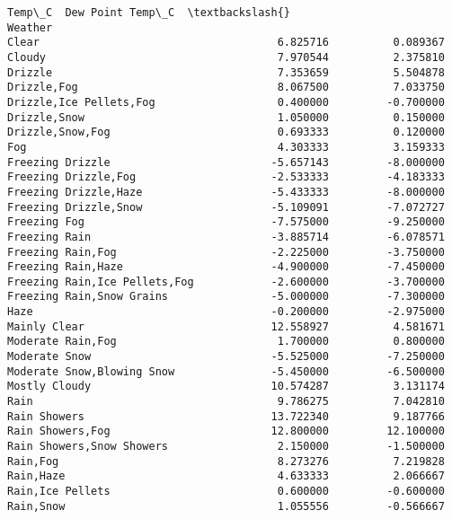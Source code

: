 \documentclass[11pt]{article}
\makeatletter
\newcommand{\boxspacing}{\kern\kvtcb@left@rule\kern\kvtcb@boxsep}
\newcommand{\prompt}[4]{
        {\ttfamily\llap{{\color{#2}[#3]:\hspace{3pt}#4}}\vspace{-\baselineskip}}
    }
\makeatother
\begin{document}
            \begin{tcolorbox}[breakable, size=fbox, boxrule=.5pt, pad at break*=1mm, opacityfill=0]
\prompt{Out}{outcolor}{59}{\boxspacing}
\begin{Verbatim}[commandchars=\\\{\}]
                                            Temp\_C  Dew Point Temp\_C  \textbackslash{}
Weather
Clear                                     6.825716          0.089367
Cloudy                                    7.970544          2.375810
Drizzle                                   7.353659          5.504878
Drizzle,Fog                               8.067500          7.033750
Drizzle,Ice Pellets,Fog                   0.400000         -0.700000
Drizzle,Snow                              1.050000          0.150000
Drizzle,Snow,Fog                          0.693333          0.120000
Fog                                       4.303333          3.159333
Freezing Drizzle                         -5.657143         -8.000000
Freezing Drizzle,Fog                     -2.533333         -4.183333
Freezing Drizzle,Haze                    -5.433333         -8.000000
Freezing Drizzle,Snow                    -5.109091         -7.072727
Freezing Fog                             -7.575000         -9.250000
Freezing Rain                            -3.885714         -6.078571
Freezing Rain,Fog                        -2.225000         -3.750000
Freezing Rain,Haze                       -4.900000         -7.450000
Freezing Rain,Ice Pellets,Fog            -2.600000         -3.700000
Freezing Rain,Snow Grains                -5.000000         -7.300000
Haze                                     -0.200000         -2.975000
Mainly Clear                             12.558927          4.581671
Moderate Rain,Fog                         1.700000          0.800000
Moderate Snow                            -5.525000         -7.250000
Moderate Snow,Blowing Snow               -5.450000         -6.500000
Mostly Cloudy                            10.574287          3.131174
Rain                                      9.786275          7.042810
Rain Showers                             13.722340          9.187766
Rain Showers,Fog                         12.800000         12.100000
Rain Showers,Snow Showers                 2.150000         -1.500000
Rain,Fog                                  8.273276          7.219828
Rain,Haze                                 4.633333          2.066667
Rain,Ice Pellets                          0.600000         -0.600000
Rain,Snow                                 1.055556         -0.566667

\end{Verbatim}
\end{tcolorbox}
\end{document}
